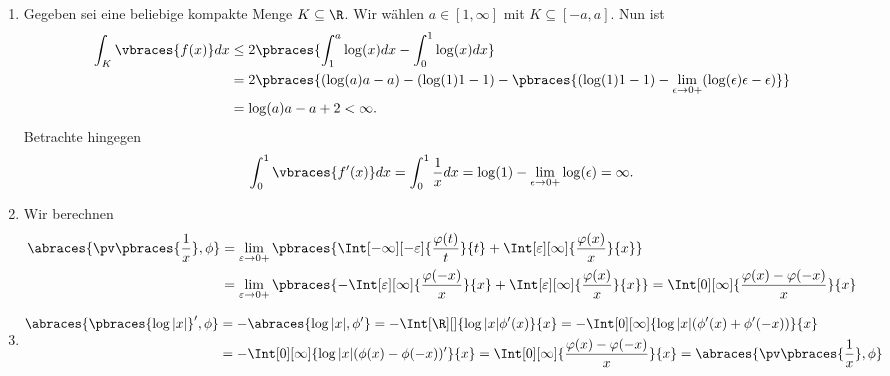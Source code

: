 
\begin{solution}
\phantom{}
\begin{enumerate}[label = (\roman*)]
	\item Gegeben sei eine beliebige kompakte Menge $K \subseteq \R$. Wir wählen $a \in [1, \infty]$ mit $K \subseteq [-a, a]$. Nun ist
	\begin{align*}
	\int_K \vbraces{f(x)} dx &\leq 2 \pbraces{\int_1^a \log(x) dx - \int_0^1 \log(x) dx} \\
	&= 2 \pbraces{(\log(a)a - a) - (\log(1)1 - 1) - \pbraces{(\log(1)1 - 1) - \lim_{\epsilon \to 0+} (\log(\epsilon)\epsilon - \epsilon )}} \\
	&= \log(a)a - a + 2 < \infty.
	\end{align*}
	Betrachte hingegen 
	\begin{align*}
	\int_0^1 \vbraces{f^\prime(x)} dx = \int_0^1 \frac{1}{x} dx = \log(1) - \lim_{\epsilon \to 0+} \log(\epsilon) = \infty.
	\end{align*}
	\item Wir berechnen
	\begin{align*}
	\abraces{\pv\pbraces{\frac{1}{x}}, \phi} &= \lim_{\varepsilon \to 0+}
	\pbraces
	{
		\Int[-\infty][-\varepsilon]
		{
			\frac{\varphi(t)}{t}
		}{t}
		+
		\Int[\varepsilon][\infty]
		{
			\frac{\varphi(x)}{x}
		}{x}
	} \\
	&= \lim_{\varepsilon \to 0+}
	\pbraces
	{
	-\Int[\varepsilon][\infty]
	{
		\frac{\varphi(-x)}{x}
	}{x}
	+
	\Int[\varepsilon][\infty]
	{
		\frac{\varphi(x)}{x}
	}{x}
	} = \Int[0][\infty]{\frac{\varphi(x) - \varphi(-x)}{x}}{x}
	\end{align*}
	\item 
	\begin{align*}
	\abraces{\pbraces{\log|x|}^\prime, \phi} &= -\abraces{\log|x|, \phi^\prime} = -\Int[\R][]{\log|x| \phi^\prime(x)}{x} = -\Int[0][\infty]{\log|x| (\phi^\prime(x) + \phi^\prime(-x))}{x} \\
	&= -\Int[0][\infty]{\log|x| (\phi(x) - \phi(-x))^\prime}{x} = \Int[0][\infty]{\frac{\varphi(x) - \varphi(-x)}{x}}{x} = \abraces{\pv\pbraces{\frac{1}{x}}, \phi}
	\end{align*}
\end{enumerate}

\end{solution}

